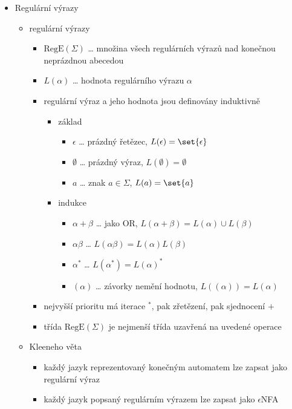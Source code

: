 \begin{itemize}
\begin{itemize}
\begin{itemize}
\end{itemize}
\end{itemize}
\item Regulární výrazy
\begin{itemize}
\item regulární výrazy
\begin{itemize}
\item $\text{RegE}(\Sigma)$ \dots{} množina všech regulárních výrazů nad konečnou neprázdnou abecedou
\item $L(\alpha)$ \dots{} hodnota regulárního výrazu $\alpha$
\item regulární výraz a jeho hodnota jsou definovány induktivně
\begin{itemize}
\item základ
\begin{itemize}
\item $\epsilon$ \dots{} prázdný řetězec, $L(\epsilon)=\set{\epsilon}$
\item $\emptyset$ \dots{} prázdný výraz, $L(\emptyset)=\emptyset$
\item $a$ \dots{} znak $a\in\Sigma$, $L(a)=\set{a}$
\end{itemize}
\item indukce
\begin{itemize}
\item $\alpha+\beta$ \dots{} jako OR, $L(\alpha+\beta)=L(\alpha)\cup L(\beta)$
\item $\alpha\beta$ \dots{} $L(\alpha\beta)=L(\alpha)L(\beta)$
\item $\alpha^*$ \dots{} $L(\alpha^*)=L(\alpha)^*$
\item $(\alpha)$ \dots{} závorky nemění hodnotu, $L((\alpha))=L(\alpha)$
\end{itemize}
\end{itemize}
\item nejvyšší prioritu má iterace $^*$, pak zřetězení, pak sjednocení $+$
\item třída $\text{RegE}(\Sigma)$ je nejmenší třída uzavřená na uvedené operace
\end{itemize}
\item Kleeneho věta
\begin{itemize}
\item každý jazyk reprezentovaný konečným automatem lze zapsat jako regulární výraz
\item každý jazyk popsaný regulárním výrazem lze zapsat jako $\epsilon$NFA
\end{itemize}
\end{itemize}

\end{itemize}
